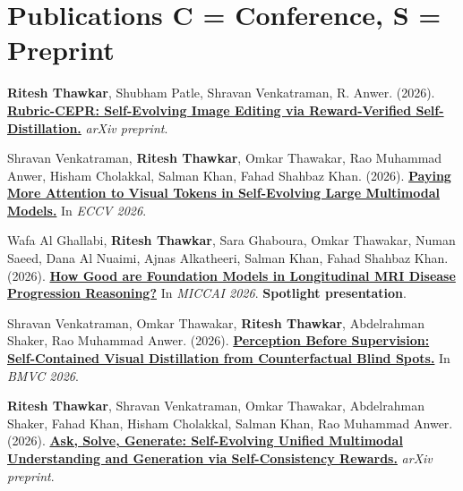 \documentclass[11pt,a4paper]{article}
\begin{document}
\section*{Publications \hfill \textcolor{linkblue}{\normalfont\small C = Conference, S = Preprint}}
\begin{description}
  \par{}
  \item[\textbf{[S1]}]
    \textbf{Ritesh Thawkar}, Shubham Patle, Shravan Venkatraman, R. Anwer. (2026). \href{https://arxiv.org/abs/2610.12469}{\textbf{Rubric-CEPR: Self-Evolving Image Editing via Reward-Verified Self-Distillation.}} \textit{arXiv preprint}.
  \par{}
  \item[\textbf{[C1]}]
    Shravan Venkatraman, \textbf{Ritesh Thawkar}, Omkar Thawakar, Rao Muhammad Anwer, Hisham Cholakkal, Salman Khan, Fahad Shahbaz Khan. (2026). \href{https://doi.org/10.1007/978-3-032-37464-6\_3}{\textbf{Paying More Attention to Visual Tokens in Self-Evolving Large Multimodal Models.}} In \textit{ECCV 2026}.
  \par{}
  \item[\textbf{[C2]}]
    Wafa Al Ghallabi, \textbf{Ritesh Thawkar}, Sara Ghaboura, Omkar Thawakar, Numan Saeed, Dana Al Nuaimi, Ajnas Alkatheeri, Salman Khan, Fahad Shahbaz Khan. (2026). \href{https://arxiv.org/abs/2608.13309}{\textbf{How Good are Foundation Models in Longitudinal MRI Disease Progression Reasoning?}} In \textit{MICCAI 2026}. \textbf{Spotlight presentation}.
  \par{}
  \item[\textbf{[C3]}]
    Shravan Venkatraman, Omkar Thawakar, \textbf{Ritesh Thawkar}, Abdelrahman Shaker, Rao Muhammad Anwer. (2026). \href{https://arxiv.org/abs/2608.09931}{\textbf{Perception Before Supervision: Self-Contained Visual Distillation from Counterfactual Blind Spots.}} In \textit{BMVC 2026}.
  \par{}
  \item[\textbf{[S2]}]
    \textbf{Ritesh Thawkar}, Shravan Venkatraman, Omkar Thawakar, Abdelrahman Shaker, Fahad Khan, Hisham Cholakkal, Salman Khan, Rao Muhammad Anwer. (2026). \href{https://arxiv.org/abs/2606.27376}{\textbf{Ask, Solve, Generate: Self-Evolving Unified Multimodal Understanding and Generation via Self-Consistency Rewards.}} \textit{arXiv preprint}.
  \par{}

\end{description}
\end{document}
